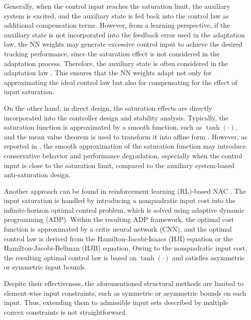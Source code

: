 \documentclass[letterpaper, journal]{IEEEtran}
\begin{document}
Generally, when the control input reaches the saturation limit, the auxiliary system is excited, and the auxiliary state is fed back into the control law as additional compensation terms.
However, from a learning perspective, if the auxiliary state is not incorporated into the feedback error used in the adaptation law, the NN weights may generate excessive control input to achieve the desired tracking performance, since the saturation effect is not considered in the adaptation process.
Therefore, the auxiliary state is often considered in the adaptation law \cite{Gao:2017aa,Esfandiari:2014aa,Esfandiari:2015aa,Liu:2024aa,Liu:2025aa,Yu:2022aa,Rezaei:2025aa}.
This ensures that the NN weights adapt not only for approximating the ideal control law but also for compensating for the effect of input saturation.

On the other hand, in direct design, the saturation effects are directly incorporated into the controller design and stability analysis.
Typically, the saturation function is approximated by a smooth function, such as $\tanh(\cdot)$, and the mean value theorem is used to transform it into affine form \cite{Wang:2013aa,Cui:2014aa,Li:2024aa}.
However, as reported in \cite{Min:2021aa}, the smooth approximation of the saturation function may introduce conservative behavior and performance degradation, especially when the control input is close to the saturation limit, compared to the auxiliary system-based anti-saturation design.

Another approach can be found in reinforcement learning (RL)-based NAC \cite{Zhang:2024ab,Qin:2025ab}.
The input saturation is handled by introducing a nonquadratic input cost into the infinite-horizon optimal control problem, which is solved using adaptive dynamic programming (ADP).
Within the resulting ADP framework, the optimal cost function is approximated by a critic neural network (CNN), and the optimal control law is derived from the Hamilton-Jacobi-Isaacs (HJI) equation or the Hamilton-Jacobi-Bellman (HJB) equation.
Owing to the nonquadratic input cost, the resulting optimal control law is based on $\tanh(\cdot)$ and satisfies asymmetric or symmetric input bounds.

Despite their effectiveness, the aforementioned structural methods are limited to element-wise input constraints, such as symmetric or asymmetric bounds on each input.
Thus, extending them to admissible input sets described by multiple convex constraints is not straightforward.

\end{document}
